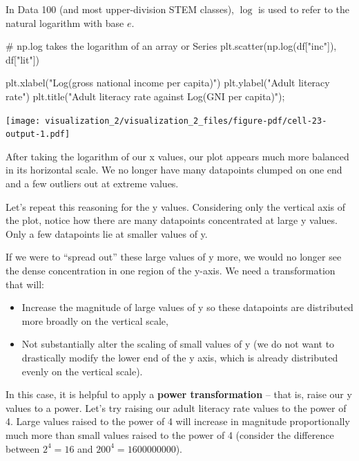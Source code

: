 \documentclass[
  letterpaper,
  DIV=11,
  numbers=noendperiod]{scrreprt}
\newenvironment{Shaded}{\begin{snugshade}}{\end{snugshade}}
\newcommand{\CommentTok}[1]{\textcolor[rgb]{0.37,0.37,0.37}{#1}}
\newcommand{\NormalTok}[1]{\textcolor[rgb]{0.00,0.23,0.31}{#1}}
\newcommand{\OperatorTok}[1]{\textcolor[rgb]{0.37,0.37,0.37}{#1}}
\newcommand{\StringTok}[1]{\textcolor[rgb]{0.13,0.47,0.30}{#1}}
\providecommand{\tightlist}{%
  \setlength{\itemsep}{0pt}\setlength{\parskip}{0pt}}\usepackage{longtable,booktabs,array}
\begin{document}
In Data 100 (and most upper-division STEM classes), \(\log\) is used to
refer to the natural logarithm with base \(e\).

\begin{Shaded}
\begin{Highlighting}[]
\CommentTok{\# np.log takes the logarithm of an array or Series}
\NormalTok{plt.scatter(np.log(df[}\StringTok{"inc"}\NormalTok{]), df[}\StringTok{"lit"}\NormalTok{])}

\NormalTok{plt.xlabel(}\StringTok{"Log(gross national income per capita)"}\NormalTok{)}
\NormalTok{plt.ylabel(}\StringTok{"Adult literacy rate"}\NormalTok{)}
\NormalTok{plt.title(}\StringTok{"Adult literacy rate against Log(GNI per capita)"}\NormalTok{)}\OperatorTok{;}
\end{Highlighting}
\end{Shaded}

\texttt{[image: visualization\_2/visualization\_2\_files/figure-pdf/cell-23-output-1.pdf]}

After taking the logarithm of our x values, our plot appears much more
balanced in its horizontal scale. We no longer have many datapoints
clumped on one end and a few outliers out at extreme values.

Let's repeat this reasoning for the y values. Considering only the
vertical axis of the plot, notice how there are many datapoints
concentrated at large y values. Only a few datapoints lie at smaller
values of y.

If we were to ``spread out'' these large values of y more, we would no
longer see the dense concentration in one region of the y-axis. We need
a transformation that will:

\begin{itemize}
\tightlist
\item
  Increase the magnitude of large values of y so these datapoints are
  distributed more broadly on the vertical scale,
\item
  Not substantially alter the scaling of small values of y (we do not
  want to drastically modify the lower end of the y axis, which is
  already distributed evenly on the vertical scale).
\end{itemize}

In this case, it is helpful to apply a \textbf{power transformation} --
that is, raise our y values to a power. Let's try raising our adult
literacy rate values to the power of 4. Large values raised to the power
of 4 will increase in magnitude proportionally much more than small
values raised to the power of 4 (consider the difference between
\(2^4 = 16\) and \(200^4 = 1600000000\)).
\end{document}
